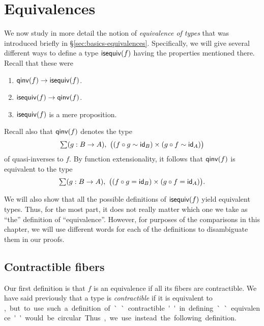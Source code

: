 \newcommand{\coh}[3]{\mathtt{coh} \; #1 \; #2 \; #3}

\chapter{Equivalences}
\label{cha:equivalences}

We now study in more detail the notion of \emph{equivalence of types} that was introduced briefly in \S\ref{sec:basics-equivalences}.
Specifically, we will give several different ways to define a type $\mathsf{isequiv}(f)$ having the properties mentioned there.
Recall that these were
\begin{enumerate}
\item $\mathsf{qinv}(f) \to \mathsf{isequiv} (f)$.\label{item:beb1}
\item $\mathsf{isequiv} (f) \to \mathsf{qinv}(f)$.\label{item:beb2}
\item $\mathsf{isequiv}(f)$ is a mere proposition.\label{item:beb3}
\end{enumerate}
Recall also that $\mathsf{qinv}(f)$ denotes the type
\begin{equation*}
  \sm{g:B\to A} \big((f \circ g \htpy \idfunc[B]) \times (g\circ f \htpy \idfunc[A])\big)
\end{equation*}
of quasi-inverses to $f$.
By function extensionality, it follows that $\mathsf{qinv}(f)$ is equivalent to the type
\begin{equation*}
  \sm{g:B\to A} \big((f \circ g = \idfunc[B]) \times (g\circ f = \idfunc[A])\big).
\end{equation*}

We will also show that all the possible definitions of $\mathsf{isequiv} (f)$ yield equivalent types.
Thus, for the most part, it does not really matter which one we take as ``the'' definition of ``equivalence''.
However, for purposes of the comparisons in this chapter, we will use different words for each of the definitions to disambiguate them in our proofs.


\section{Contractible fibers}
\label{sec:contrf}

Our first definition is that $f$ is an equivalence if all its fibers are contractible.
We have said previously that a type is \emph{contractible} if it is equivalent to \unit, but to use such a definition of ``contractible'' in defining ``equivalence'' would be circular.
Thus, we use instead the following definition.

